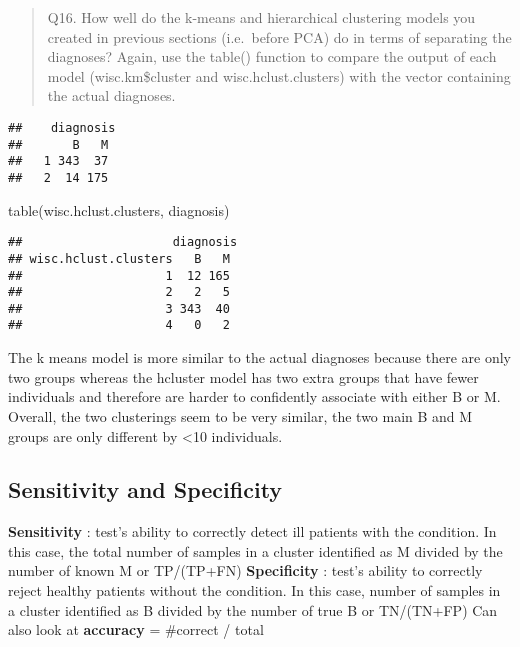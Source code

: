 \documentclass[
]{article}
\newenvironment{Shaded}{\begin{snugshade}}{\end{snugshade}}
\newcommand{\FunctionTok}[1]{\textcolor[rgb]{0.00,0.00,0.00}{#1}}
\newcommand{\NormalTok}[1]{#1}
\newcommand{\SpecialCharTok}[1]{\textcolor[rgb]{0.00,0.00,0.00}{#1}}
\begin{document}
\begin{quote}
Q16. How well do the k-means and hierarchical clustering models you
created in previous sections (i.e.~before PCA) do in terms of separating
the diagnoses? Again, use the table() function to compare the output of
each model (wisc.km\$cluster and wisc.hclust.clusters) with the vector
containing the actual diagnoses.
\end{quote}

\begin{Shaded}
\end{Shaded}

\begin{verbatim}
##    diagnosis
##       B   M
##   1 343  37
##   2  14 175
\end{verbatim}

\begin{Shaded}
\begin{Highlighting}[]
\FunctionTok{table}\NormalTok{(wisc.hclust.clusters, diagnosis)}
\end{Highlighting}
\end{Shaded}

\begin{verbatim}
##                     diagnosis
## wisc.hclust.clusters   B   M
##                    1  12 165
##                    2   2   5
##                    3 343  40
##                    4   0   2
\end{verbatim}

The k means model is more similar to the actual diagnoses because there
are only two groups whereas the hcluster model has two extra groups that
have fewer individuals and therefore are harder to confidently associate
with either B or M. Overall, the two clusterings seem to be very
similar, the two main B and M groups are only different by \textless10
individuals.

\hypertarget{sensitivity-and-specificity}{%
\subsection{Sensitivity and
Specificity}\label{sensitivity-and-specificity}}

\textbf{Sensitivity} : test's ability to correctly detect ill patients
with the condition. In this case, the total number of samples in a
cluster identified as M divided by the number of known M or TP/(TP+FN)
\textbf{Specificity} : test's ability to correctly reject healthy
patients without the condition. In this case, number of samples in a
cluster identified as B divided by the number of true B or TN/(TN+FP)
Can also look at \textbf{accuracy} = \#correct / total
\end{document}
